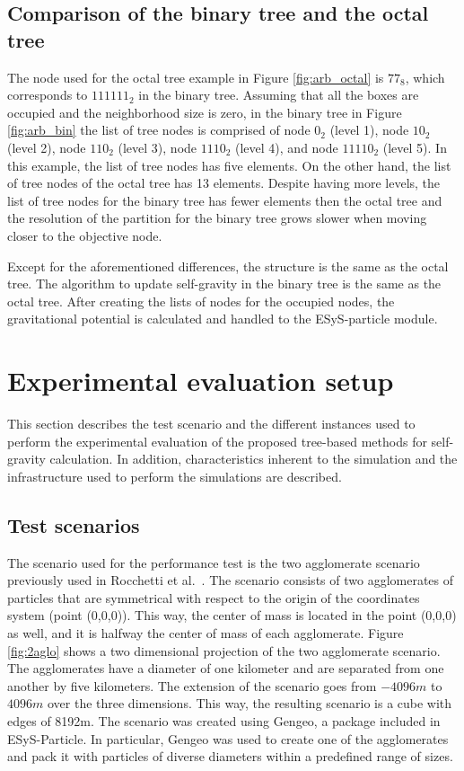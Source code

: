 \documentclass[runningheads]{llncs}
\begin{document}
\subsection{Comparison of the binary tree and the octal tree}

The node used for the octal tree example in Figure \ref{fig:arb_octal} is $77_8$, which corresponds to $111111_2$ in the binary tree. Assuming that all the boxes are occupied and the neighborhood size is zero, in the binary tree in Figure \ref{fig:arb_bin} the list of tree nodes is comprised of node $0_2$ (level 1), node $10_2$ (level 2), node $110_2$ (level 3), node $1110_2$ (level 4), and node $11110_2$ (level 5). In this example, the list of tree nodes has five elements. On the other hand, the list of tree nodes of the octal tree has 13 elements. Despite having more levels, the list of tree nodes for the binary tree has fewer elements then the octal tree 
and
the resolution of the partition for the binary tree grows slower when moving closer to the objective node.   

Except for the aforementioned differences, 
the structure is the same as the octal tree. The algorithm to update self-gravity in the binary tree is the same as the octal tree. After creating the lists of nodes for the occupied nodes, the gravitational potential is calculated and handled to the ESyS-particle module.  
 
\section{Experimental evaluation setup}
\label{sec:test_scenarios}

This section describes the test scenario and the different instances used to perform the experimental evaluation of the proposed tree-based methods for self-gravity calculation. In addition, characteristics inherent to the simulation and the infrastructure used to perform the simulations are described.

\subsection{Test scenarios}
The scenario used for the performance test is the two agglomerate scenario previously used in Rocchetti et al.~\cite{rocchetti2017performance}. The scenario consists of two agglomerates of particles that are symmetrical with respect to the origin of the coordinates system (point (0,0,0)). This way, the center of mass is located in the point (0,0,0) as well, and it is halfway the center of mass of each agglomerate. Figure \ref{fig:2aglo} shows a two dimensional projection of the two agglomerate scenario. The agglomerates have a diameter of one kilometer and are separated from one another by five kilometers. The extension of the scenario goes from $-4096m$ to $4096m$ over the three dimensions. This way, the resulting scenario is a cube with edges of 8192m. The scenario was created using Gengeo, a package included in ESyS-Particle. In particular, Gengeo was used to create one of the agglomerates and pack it with particles of diverse diameters within a predefined range of sizes. 
\end{document}
